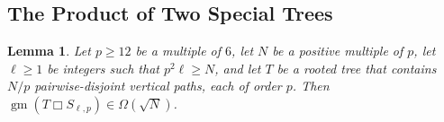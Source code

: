\documentclass[kpfonts,lotsofwhite]{patmorin}
\newcommand{\boxprod}{\mathbin{\Box}}
\renewcommand{\ge}{\geqslant}
\renewcommand{\le}{\leqslant}
\DeclareMathOperator{\gm}{gm}
\newcommand{\pat}[1]{\textcolor{Maroon}{PM: #1}}
\theoremstyle{plain}
\newtheorem{lem}[thm]{Lemma}
\theoremstyle{definition}
\begin{document}
%
%

\subsection{The Product of Two Special Trees}


\begin{lem}\label{star_times_star}
  Let $p\ge 12$ be a multiple of $6$, let $N$ be a positive multiple of $p$, let $\ell\ge 1$ be integers such that $p^2\ell \ge N$, and let $T$ be a rooted tree that contains $N/p$ pairwise-disjoint vertical paths, each of order $p$.  Then $\gm(T\boxprod S_{\ell,p})\in \Omega(\sqrt{N})$.
\end{lem}
\end{document}

